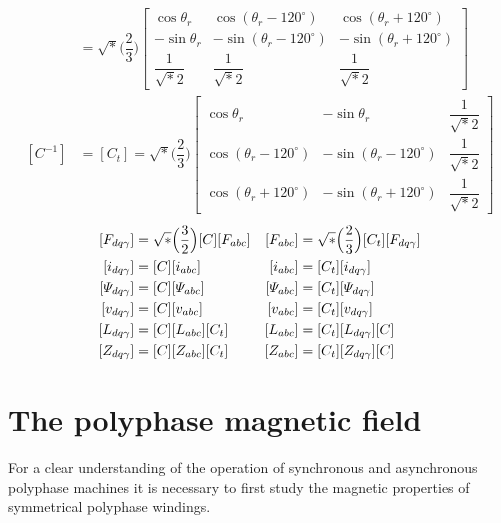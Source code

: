 \documentclass[a4paper,numbers=noenddot,12pt]{scrbook}
\begin{document}
        \begin{align*}
            [C] & = 
            \sqrt*{\Big( \dfrac{2}{3} \Big)}
            \begin{bmatrix}
                \cos \theta_r & \cos (\theta_r - 120^{\circ}) & \cos (\theta_r + 120^{\circ}) \\
                - \sin \theta_r & - \sin (\theta_r - 120^{\circ}) & - \sin (\theta_r + 120^{\circ}) \\
                \dfrac{1}{\sqrt*{2}} & \dfrac{1}{\sqrt*{2}} & \dfrac{1}{\sqrt*{2}}
            \end{bmatrix} \\
            [C^{-1}] & = [C_t] =
            \sqrt*{\Big( \dfrac{2}{3} \Big)} %
            \begin{bmatrix}
                \cos \theta_r & -\sin \theta_r & \dfrac{1}{\sqrt*{2}} \\[2ex]
                \cos (\theta_r - 120^{\circ}) & - \sin (\theta_r - 120^{\circ}) & \dfrac{1}{\sqrt*{2}} \\[2ex]
                \cos (\theta_r + 120^{\circ}) & - \sin (\theta_r + 120^{\circ}) & \dfrac{1}{\sqrt*{2}}
            \end{bmatrix}
        \end{align*}
        \begin{equation}
            \begin{aligned}\relax
                [F_{d q \gamma}] & = \sqrt*{\Big( \dfrac{3}{2} \Big)} [C] [F_{abc}] & [F_{abc}] & = \sqrt*{\Big( \dfrac{2}{3} \Big)} [C_t] [F_{d q \gamma}] \\
                [i_{d q \gamma}] & = [C] [i_{abc}] & [i_{abc}] & =[C_t] [i_{d q \gamma}] \\
                [\varPsi_{dq\gamma}] & = [C] [\varPsi_{abc}] & [\varPsi_{abc}] & = [C_t] [\varPsi_{d q \gamma}] \\
                [v_{dq\gamma}] & = [C] [v_{abc}]             & [v_{abc}] & = [C_t] [v_{d q \gamma}] \\
                [L_{dq\gamma}] & = [C] [L_{abc}] [C_t]       & [L_{abc}] & = [C_t] [L_{d q \gamma}] [C] \\
                [Z_{dq\gamma}] & = [C] [Z_{abc}] [C_t]       & [Z_{abc}] & = [C_t] [Z_{d q \gamma}] [C] 
            \end{aligned}
        \end{equation}

        \section{The polyphase magnetic field}
        For a clear understanding of the operation of synchronous and asynchronous polyphase machines it is necessary to first study the magnetic properties of symmetrical polyphase windings.
\end{document}

